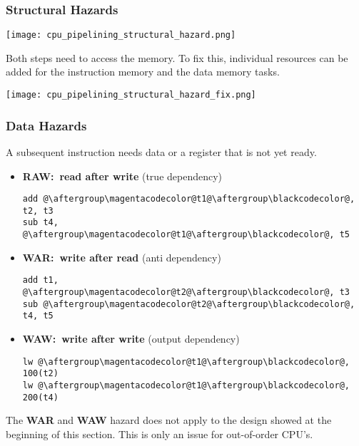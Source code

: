 \subsubsection{Structural Hazards}\label{structural hazards}

\texttt{[image: cpu\_pipelining\_structural\_hazard.png]}

Both steps need to access the memory. To fix this, individual resources can be added for the instruction memory and the data memory tasks.

\begin{center}
    \texttt{[image: cpu\_pipelining\_structural\_hazard\_fix.png]}
\end{center}

\subsubsection{Data Hazards}\label{data hazards}

A subsequent instruction needs data or a register that is not yet ready.

\begin{itemize}
    \item \textbf{RAW:\ read after write} (true dependency)
          \begin{lstlisting}[escapechar=@]
add @\aftergroup\magentacodecolor@t1@\aftergroup\blackcodecolor@, t2, t3
sub t4, @\aftergroup\magentacodecolor@t1@\aftergroup\blackcodecolor@, t5
\end{lstlisting}
    \item \textbf{WAR:\ write after read} (anti dependency)
          \begin{lstlisting}[escapechar=@]
add t1, @\aftergroup\magentacodecolor@t2@\aftergroup\blackcodecolor@, t3
sub @\aftergroup\magentacodecolor@t2@\aftergroup\blackcodecolor@, t4, t5
\end{lstlisting}
    \item \textbf{WAW:\ write after write} (output dependency)
          \begin{lstlisting}[escapechar=@]
lw @\aftergroup\magentacodecolor@t1@\aftergroup\blackcodecolor@, 100(t2)
lw @\aftergroup\magentacodecolor@t1@\aftergroup\blackcodecolor@, 200(t4)
\end{lstlisting}
\end{itemize}

The \textbf{WAR} and \textbf{WAW} hazard does not apply to the design showed at the beginning of this section. This is only an issue for out-of-order CPU's.

